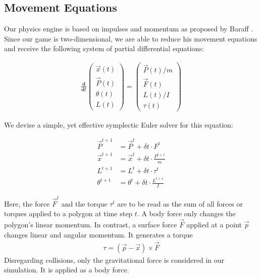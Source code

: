 \vspace{-\abovedisplayskip}
\subsection{Movement Equations}

Our physics engine is based on impulses and momentum as proposed by Baraff \cite{baraff}.
Since our game is two-dimensional, we are able to reduce his movement equations and receive the following system of partial differential equations:

\begin{align}
  \frac{\textbf{d}}{\textbf{d}{t}} 
  \left(
    \begin{array}{c}
      \vec{x}(t)\\
      \vec{P}(t)\\
      \theta(t)\\
      L(t)
    \end{array}
  \right)
  =
  \left(
    \begin{array}{c}
      {\vec{P}(t)}/{m}\\
      \vec{F}(t)\\
      L(t)/I\\
      \tau(t)
    \end{array}
  \right)
\end{align}
 
We devise a simple, yet effective symplectic Euler solver for this equation:

\begin{align}
  \vec{P}^{t+1} &= \vec{P}^{t} + \delta t \cdot F^{t}\\
  \vec{x}^{t+1} &= \vec{x}^{t} + \delta t \cdot \frac{P^{t+1}}{m}\\
  L^{t+1} &= L^{t} + \delta t \cdot \tau^{t}\\
  \theta^{t+1} &= \theta^{t} + \delta t \cdot \frac{L^{t+1}}{I}
\end{align}

Here, the force $\vec{F}^{t}$ and the torque $\tau^{t}$ are to be read as the sum of all forces or torques applied to a polygon at time step $t$.
A body force only changes the polygon's linear momentum.
In contrast, a surface force $\vec{F}$ applied at a point $\vec{p}$ changes linear and angular momentum.
It generates a torque
\begin{align}
  \tau = (\vec{p} - \vec{x}) \times \vec{F}\label{eq:forceToTorque}
\end{align}
Disregarding collisions, only the gravitational force is considered in our simulation.
It is applied as a body force.

